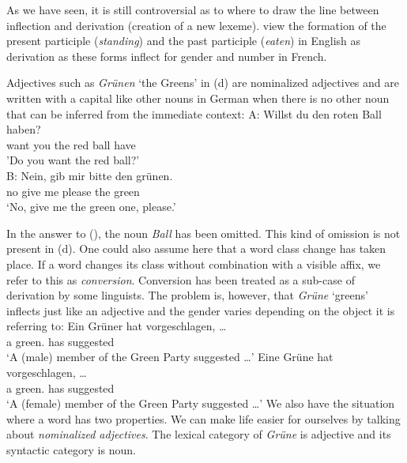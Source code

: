 {As we have seen, it is still controversial as to where to draw the line between inflection and derivation (creation of a new lexeme).
\citet*[--264]{SWB2003a} view the formation of the present participle (\emph{standing}) and the past participle (\emph{eaten}) in English
as derivation as these forms inflect for gender and number in French.

Adjectives such as \emph{Grünen} `the Greens' in (d) are nominalized adjectives and are written with a capital like other nouns in German when there is
no other noun that can be inferred from the immediate context:
\ea
\gll A: Willst du den roten Ball haben?\\
	 {} want you the red ball have\\
\glt {} 'Do you want the red ball?'\\

\gll B: Nein, gib mir bitte den grünen.\\
	{} no give me please the green\\
\glt {} `No, give me the green one, please.'
\z

\noindent
In the answer to (), the noun \emph{Ball} has been omitted. This kind of omission is not present in (d). One could also assume here that
a word class change has taken place. If a word changes its class without combination with a visible affix, we refer to this as \emph{conversion}.
Conversion has been treated as a sub-case of derivation by some linguists.
The problem is, however, that \emph{Grüne} `greens' inflects just like an adjective and the gender varies depending on the object it is referring to:
\eal
\ex 
\gll Ein Grüner hat vorgeschlagen, \ldots\\
	 a green.\mas{} has suggested\\
\glt `A (male) member of the Green Party suggested \ldots'
\ex 
\gll Eine Grüne hat vorgeschlagen, \ldots\\
	 a green.\fem{} has suggested\\
\glt `A (female) member of the Green Party suggested \ldots'
\zl
We also have the situation where a word has two properties. We can make
life easier for ourselves by talking about \emph{nominalized adjectives}. The lexical
category of \emph{Grüne} is adjective and its syntactic category is noun.

}
